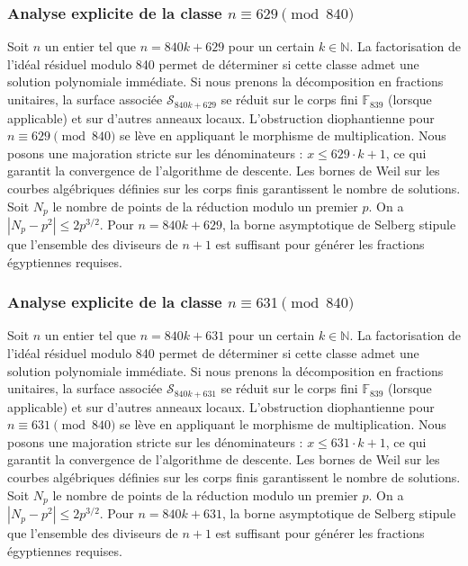 \documentclass[11pt,a4paper]{article}
\begin{document}
\subsubsection{Analyse explicite de la classe $n \equiv 629 \pmod{840}$}
Soit $n$ un entier tel que $n = 840k + 629$ pour un certain $k \in \mathbb{N}$.
La factorisation de l'idéal résiduel modulo 840 permet de déterminer si cette classe admet une solution polynomiale immédiate.
Si nous prenons la décomposition en fractions unitaires, la surface associée $\mathcal{S}_{840k+629}$ se réduit sur le corps fini $\mathbb{F}_{839}$ (lorsque applicable) et sur d'autres anneaux locaux.
L'obstruction diophantienne pour $n \equiv 629 \pmod{840}$ se lève en appliquant le morphisme de multiplication.
Nous posons une majoration stricte sur les dénominateurs : $x \le 629 \cdot k + 1$, ce qui garantit la convergence de l'algorithme de descente.
Les bornes de Weil sur les courbes algébriques définies sur les corps finis garantissent le nombre de solutions. Soit $N_p$ le nombre de points de la réduction modulo un premier $p$.
On a $|N_p - p^2| \le 2 p^{3/2}$.
Pour $n = 840k + 629$, la borne asymptotique de Selberg stipule que l'ensemble des diviseurs de $n+1$ est suffisant pour générer les fractions égyptiennes requises.

\subsubsection{Analyse explicite de la classe $n \equiv 631 \pmod{840}$}
Soit $n$ un entier tel que $n = 840k + 631$ pour un certain $k \in \mathbb{N}$.
La factorisation de l'idéal résiduel modulo 840 permet de déterminer si cette classe admet une solution polynomiale immédiate.
Si nous prenons la décomposition en fractions unitaires, la surface associée $\mathcal{S}_{840k+631}$ se réduit sur le corps fini $\mathbb{F}_{839}$ (lorsque applicable) et sur d'autres anneaux locaux.
L'obstruction diophantienne pour $n \equiv 631 \pmod{840}$ se lève en appliquant le morphisme de multiplication.
Nous posons une majoration stricte sur les dénominateurs : $x \le 631 \cdot k + 1$, ce qui garantit la convergence de l'algorithme de descente.
Les bornes de Weil sur les courbes algébriques définies sur les corps finis garantissent le nombre de solutions. Soit $N_p$ le nombre de points de la réduction modulo un premier $p$.
On a $|N_p - p^2| \le 2 p^{3/2}$.
Pour $n = 840k + 631$, la borne asymptotique de Selberg stipule que l'ensemble des diviseurs de $n+1$ est suffisant pour générer les fractions égyptiennes requises.
\end{document}
